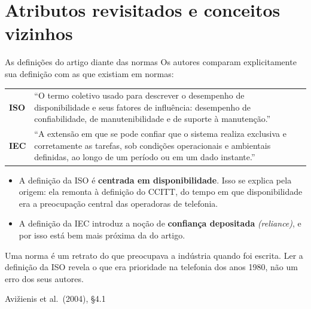 \documentclass{beamer}
\newcommand{\en}[1]{{\color{depCinza}\textit{#1}}}
\newcommand{\sect}[1]{\par\smallskip\hfill{\tiny\color{black!55}Avi\v{z}ienis et al.\ (2004), #1}}
\begin{document}
\section{Atributos revisitados e conceitos vizinhos}

\begin{frame}{As defini\c{c}\~oes do artigo diante das normas}
    \footnotesize
    Os autores comparam explicitamente sua defini\c{c}\~ao com as que existiam em normas:
    \medskip
    \begin{tabularx}{\linewidth}{@{}p{2.0cm} >{\raggedright\arraybackslash}X@{}}
        \toprule
        \textbf{ISO} & ``O termo coletivo usado para descrever o desempenho de disponibilidade e seus fatores de influ\^encia: desempenho de confiabilidade, de manutenibilidade e de suporte \`a manuten\c{c}\~ao.'' \\
        \addlinespace
        \textbf{IEC} & ``A extens\~ao em que se pode confiar que o sistema realiza exclusiva e corretamente as tarefas, sob condi\c{c}\~oes operacionais e ambientais definidas, ao longo de um per\'iodo ou em um dado instante.'' \\
        \bottomrule
    \end{tabularx}
    \medskip
    \begin{itemize}
        \item A defini\c{c}\~ao da ISO \'e \textbf{centrada em disponibilidade}. Isso se explica pela origem: ela remonta \`a defini\c{c}\~ao do CCITT, do tempo em que disponibilidade era a preocupa\c{c}\~ao central das operadoras de telefonia.
        \item A defini\c{c}\~ao da IEC introduz a no\c{c}\~ao de \textbf{confian\c{c}a depositada} \en{(reliance)}, e por isso est\'a bem mais pr\'oxima da do artigo.
    \end{itemize}
    \medskip
    \begin{ancora}
        \footnotesize
        Uma norma \'e um retrato do que preocupava a ind\'ustria quando foi escrita. Ler a defini\c{c}\~ao da ISO revela o que era prioridade na telefonia dos anos 1980, n\~ao um erro dos seus autores.
    \end{ancora}
    \sect{\S4.1}
\end{frame}
\end{document}
